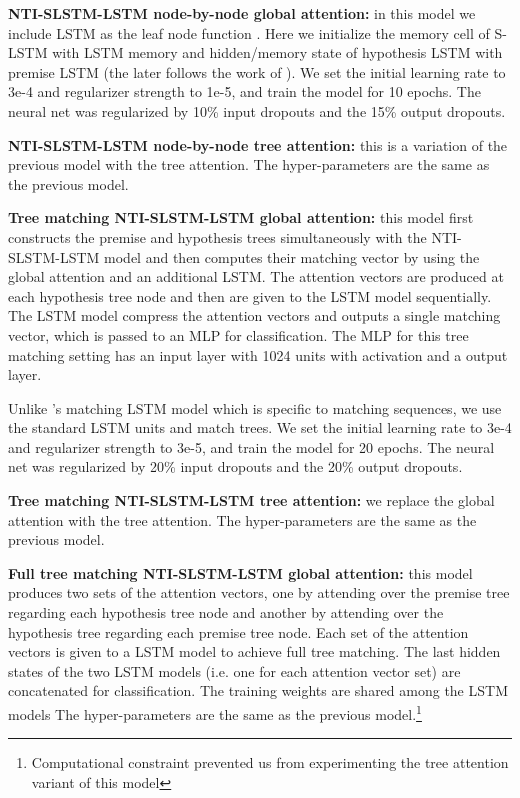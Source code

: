 \documentclass[11pt]{article}
\begin{document}
\textbf{NTI-SLSTM-LSTM node-by-node global attention:} in this model we include LSTM as the leaf node function . Here we initialize the memory cell of S-LSTM with LSTM memory and hidden/memory state of hypothesis LSTM with premise LSTM (the later follows the work of \cite{rocktaschel:16}). We set the initial learning rate to 3e-4 and  regularizer strength to 1e-5, and train the model for 10 epochs. The neural net was regularized by 10\% input dropouts and the 15\% output dropouts.

\textbf{NTI-SLSTM-LSTM node-by-node tree attention:} this is a variation of the previous model with the tree attention. The hyper-parameters are the same as the previous model.

\textbf{Tree matching NTI-SLSTM-LSTM global attention:} this model first constructs the premise and hypothesis trees simultaneously with the NTI-SLSTM-LSTM model and then computes their matching vector by using the global attention and an additional LSTM. The attention vectors are produced at each hypothesis tree node and then are given to the LSTM model sequentially. The LSTM model compress the attention vectors and outputs a single matching vector, which is passed to an MLP for classification. The MLP for this tree matching setting has an input layer with 1024 units with  activation and a  output layer.

Unlike 's matching LSTM model which is specific to matching sequences, 
we use the standard LSTM units and match trees.
We set the initial learning rate to 3e-4 and  regularizer strength to 3e-5, and train the model for 20 epochs. The neural net was regularized by 20\% input dropouts and the 20\% output dropouts.

\textbf{Tree matching NTI-SLSTM-LSTM tree attention:} we replace the global attention with the tree attention. The hyper-parameters are the same as the previous model.

\textbf{Full tree matching NTI-SLSTM-LSTM global attention:} this model produces two sets of the attention vectors, one by attending over the premise tree regarding each hypothesis tree node and another by attending over the hypothesis tree regarding each premise tree node. Each set of the attention vectors is given to a LSTM model to achieve full tree matching. The last hidden states of the two LSTM models (i.e. one for each attention vector set) are concatenated for classification. The training weights are shared among the LSTM models The hyper-parameters are the same as the previous model.\footnote{Computational constraint prevented us from experimenting the tree attention variant of this model}
\end{document}
